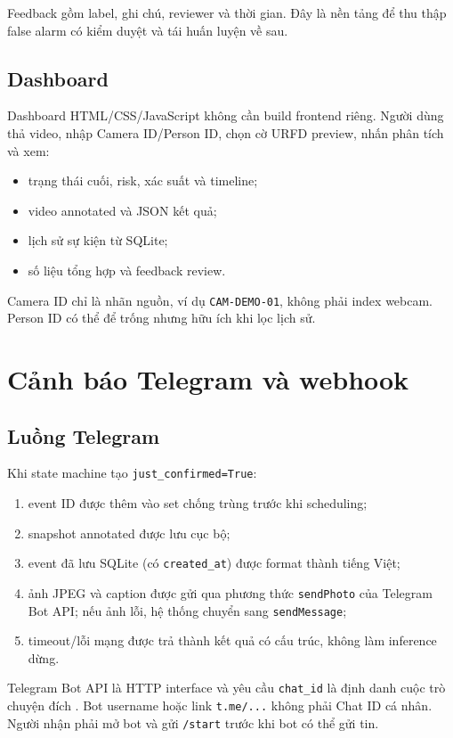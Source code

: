 \documentclass[12pt,a4paper,oneside]{report}
\newcommand{\code}[1]{\texttt{#1}}
\begin{document}
Feedback gồm label, ghi chú, reviewer và thời gian. Đây là nền tảng để thu thập
false alarm có kiểm duyệt và tái huấn luyện về sau.

\section{Dashboard}

Dashboard HTML/CSS/JavaScript không cần build frontend riêng. Người dùng thả
video, nhập Camera ID/Person ID, chọn cờ URFD preview, nhấn phân tích và xem:

\begin{itemize}
  \item trạng thái cuối, risk, xác suất và timeline;
  \item video annotated và JSON kết quả;
  \item lịch sử sự kiện từ SQLite;
  \item số liệu tổng hợp và feedback review.
\end{itemize}

Camera ID chỉ là nhãn nguồn, ví dụ \code{CAM-DEMO-01}, không phải index webcam.
Person ID có thể để trống nhưng hữu ích khi lọc lịch sử.

\chapter{Cảnh báo Telegram và webhook}

\section{Luồng Telegram}

Khi state machine tạo \code{just\_confirmed=True}:

\begin{enumerate}
  \item event ID được thêm vào set chống trùng trước khi scheduling;
  \item snapshot annotated được lưu cục bộ;
  \item event đã lưu SQLite (có \code{created\_at}) được format thành tiếng Việt;
  \item ảnh JPEG và caption được gửi qua phương thức \code{sendPhoto} của
  Telegram Bot API; nếu ảnh lỗi, hệ thống chuyển sang \code{sendMessage};
  \item timeout/lỗi mạng được trả thành kết quả có cấu trúc, không làm inference
  dừng.
\end{enumerate}

Telegram Bot API là HTTP interface và yêu cầu \code{chat\_id} là định danh cuộc
trò chuyện đích \cite{telegramapi}. Bot username hoặc link \code{t.me/...} không
phải Chat ID cá nhân. Người nhận phải mở bot và gửi \code{/start} trước khi bot
có thể gửi tin.
\end{document}

